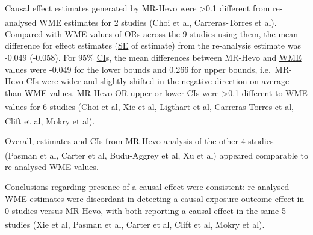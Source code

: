 \documentclass[
]{article}
\begin{document}
\leavevmode\newline Causal effect estimates generated by MR-Hevo were \textgreater0.1 different from re-analysed \hyperref[acronyms_WME]{WME} estimates for 2 studies (Choi et al\textsuperscript{}, Carreras-Torres et al\textsuperscript{}). Compared with \hyperref[acronyms_WME]{WME} values of \hyperref[acronyms_OR]{OR}s across the 9 studies using them, the mean difference for effect estimates (\hyperref[acronyms_SE]{SE} of estimate) from the re-analysis estimate was -0.049 (-0.058). For 95\% \hyperref[acronyms_CI]{CI}s, the mean differences between MR-Hevo and \hyperref[acronyms_WME]{WME} values were -0.049 for the lower bounds and 0.266 for upper bounds, i.e.~MR-Hevo \hyperref[acronyms_CI]{CI}s were wider and slightly shifted in the negative direction on average than \hyperref[acronyms_WME]{WME} values. MR-Hevo \hyperref[acronyms_OR]{OR} upper or lower \hyperref[acronyms_CI]{CI}s were \textgreater0.1 different to \hyperref[acronyms_WME]{WME} values for 6 studies (Choi et al\textsuperscript{}, Xie et al\textsuperscript{}, Ligthart et al\textsuperscript{}, Carreras-Torres et al\textsuperscript{}, Clift et al\textsuperscript{}, Mokry et al\textsuperscript{}).

Overall, estimates and \hyperref[acronyms_CI]{CI}s from MR-Hevo analysis of the other 4 studies (Pasman et al\textsuperscript{}, Carter et al\textsuperscript{}, Budu-Aggrey et al\textsuperscript{}, Xu et al\textsuperscript{}) appeared comparable to re-analysed \hyperref[acronyms_WME]{WME} values.

Conclusions regarding presence of a causal effect were consistent: re-analysed \hyperref[acronyms_WME]{WME} estimates were discordant in detecting a causal exposure-outcome effect in 0 studies versus MR-Hevo, with both reporting a causal effect in the same 5 studies (Xie et al\textsuperscript{}, Pasman et al\textsuperscript{}, Carter et al\textsuperscript{}, Clift et al\textsuperscript{}, Mokry et al\textsuperscript{}).
\end{document}
